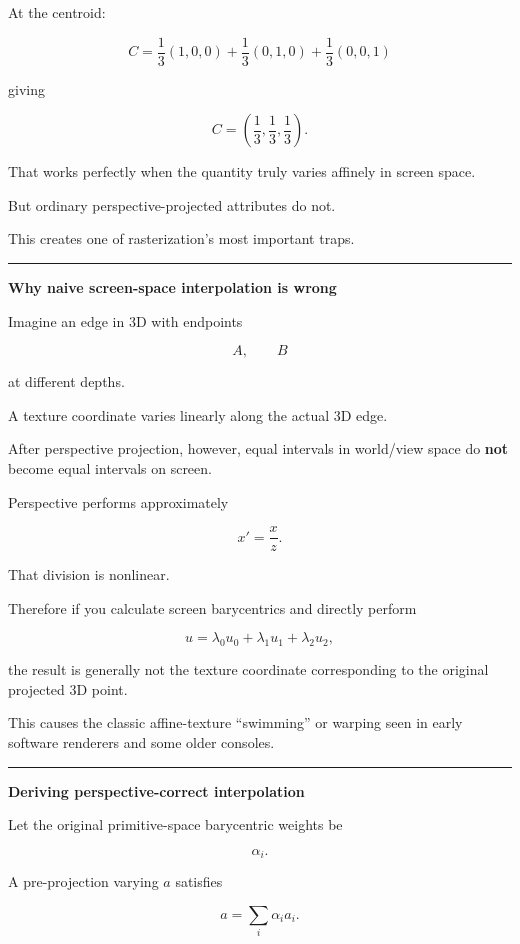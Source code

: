 At the centroid:

\[
C=
\frac13(1,0,0)
+
\frac13(0,1,0)
+
\frac13(0,0,1)
\]

giving

\[
C=
\left(
\frac13,\frac13,\frac13
\right).
\]

That works perfectly when the quantity truly varies affinely in screen space.

But ordinary perspective-projected attributes do not.

This creates one of rasterization's most important traps.

\begin{center}\rule{0.5\linewidth}{0.5pt}\end{center}

\textbf{Why naive screen-space interpolation is wrong}

Imagine an edge in 3D with endpoints

\[
A,\qquad B
\]

at different depths.

A texture coordinate varies linearly along the actual 3D edge.

After perspective projection, however, equal intervals in world/view space do \textbf{not} become equal intervals on screen.

Perspective performs approximately

\[
x'=\frac{x}{z}.
\]

That division is nonlinear.

Therefore if you calculate screen barycentrics and directly perform

\[
u=
\lambda_0u_0+
\lambda_1u_1+
\lambda_2u_2,
\]

the result is generally not the texture coordinate corresponding to the original projected 3D point.

This causes the classic affine-texture ``swimming'' or warping seen in early software renderers and some older consoles.

\begin{center}\rule{0.5\linewidth}{0.5pt}\end{center}

\textbf{Deriving perspective-correct interpolation}

Let the original primitive-space barycentric weights be

\[
\alpha_i.
\]

A pre-projection varying \(a\) satisfies

\[
a=
\sum_i\alpha_i a_i.
\]

